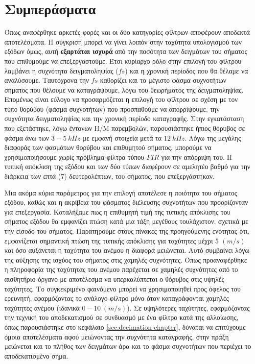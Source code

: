 \documentclass[breaklines=true, 12pt]{article}
\begin{document}
{{{\section{Συμπεράσματα}
\label{sec:orgd5ecebc}
Όπως αναφέρθηκε αρκετές φορές και οι δύο κατηγορίες φίλτρων αποφέρουν αποδεκτά
αποτελέσματα. Η σύγκριση μπορεί να γίνει λοιπόν στην ταχύτητα
υπολογισμού των εξόδων όμως, αυτή \textbf{εξαρτάται ισχυρά} από την ποσότητα των
δειγμάτων του σήματος που επιθυμούμε να επεξεργαστούμε. Έτσι κυρίαρχο
ρόλο στην επιλογή του φίλτρου λαμβάνει η συχνότητα δειγματοληψίας (\(fs\)) και η
χρονική περίοδος που θα θέλαμε να αναλύσουμε. Ταυτόχρονα την \(fs\) καθορίζει
και το μέγιστο φάσμα συχνοτήτων σήματος που θέλουμε να καταγράψουμε, λόγω του
θεωρήματος της δειγματοληψίας. Επομένως είναι εύλογο να προσαρμόζεται η
επιλογή του φίλτρου σε σχέση με τον τύπο θορύβου (φάσμα συχνοτήτων)
που προσπαθούμε να απορρίψουμε, την συχνότητα δειγματοληψίας και την χρονική
περίοδο καταγραφής. Στην εγκατάσταση που εξετάστηκε, λόγω έντονων Η/Μ
παρεμβολών, παρουσιάστηκε ήπιος θόρυβος σε φάσμα άνω των \(3-5\ kHz\) με εμφανή
στοιχεία μετά τα \(12\ kHz\). Λόγω της μεγάλης διαφοράς των φασμάτων θορύβου και
επιθυμητού σήματος, μπορούμε να χρησιμοποιήσουμε χωρίς πρόβλημα φίλτρα τύπου
\(FIR\) για την απόρριψη του. Η τυπική απόκλιση της εξόδου και των δύο τύπων
διαφέρουν σε αμελητέο βαθμό για την διάρκεια των επτά (7) δευτερολέπτων, του
σήματος, που επεξεργάστηκαν.

Μια ακόμα κύρια παράμετρος για την επιλογή αποτέλεσε η ποιότητα του σήματος
εξόδου, καθώς και η ακρίβεια του φάσματος διέλευσης συχνοτήτων που
προορίζονταν για επεξεργασία. Καταλήξαμε πως η επιθυμητή τιμή της τυπικής
απόκλισης του σήματος εξόδου θα εμφανίζει πτώση κατά μια τάξη μεγέθους
τουλάχιστον, σχετικά με την είσοδο του σήματος. Παρατηρούμε στους πίνακες της
προηγούμενης ενότητας ότι, εμφανίζεται σημαντική πτώση της τυπικής απόκλισης
για ταχύτητες μέχρι 5 \((m/s)\) και όσο αυξάνεται η ταχύτητα του ανέμου η διαφορά
μειώνεται. Αυτό συμβαίνει λόγω της αύξησης της ισχύος του σήματος στις χαμηλές
συχνότητες. Όπως προαναφέρθηκε η πληροφορία της ταχύτητας του ανέμου παρέχεται
σε χαμηλές συχνότητες από το αισθητήριο όργανο με αποτέλεσμα να υπερκαλύπτεται
ο θόρυβος στις υψηλές ταχύτητες. Το συγκεκριμένο φαινόμενο μπορεί να
χρησιμοποιηθεί προς όφελος του ερευνητή, εφαρμόζοντας το ανάλογο
φίλτρο μόνο όταν καταγράφονται χαμηλές ταχύτητες ανέμου (ιδανικά \(0-10\ (m/s)\)).
Σε υψηλότερες ταχύτητες, εφαρμόζοντας την τεχνική του αποδεκατισμού σε συνδυασμό
με ένα φίλτρο κατά της αλλοίωσης, όπως παρουσιάστηκε στο κεφάλαιο
\ref{sec:decimation-chapter}, δύναται να επιτύχουμε όμοια αποτελέσματα αφού
μειώνοντας την συχνότητα καταγραφής, στην πράξη μειώνεται και το πλήθος των
δειγμάτων άρα και το φάσμα συχνοτήτων που περιέχει το αποδεκατισμένο σήμα.

}}}
\end{document}
